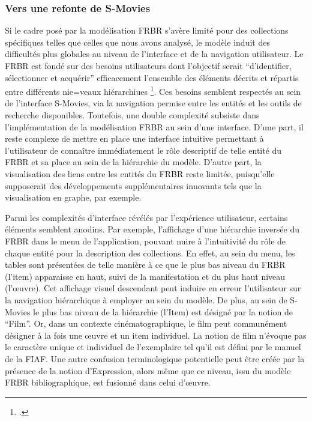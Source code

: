 \subsubsection{Vers une refonte de S-Movies} 

Si le cadre posé par la modélisation FRBR s’avère limité pour des collections spécifiques telles que celles que nous avons analysé, le modèle induit des difficultés plus globales au niveau de l’interface et de la navigation utilisateur. Le FRBR est fondé sur des besoins utilisateurs dont l’objectif serait “d’identifier, sélectionner et acquérir” efficacement l’ensemble des éléments décrits et répartis entre différents nie=veaux hiérarchiues \footcite{zotero-item-646}. Ces besoins semblent respectés au sein de l’interface S-Movies, via la navigation permise entre les entités et les outils de recherche disponibles. Toutefois, une double complexité subsiste dans l’implémentation de la modélisation FRBR au sein d’une interface. D’une part, il reste complexe de mettre en place une interface intuitive permettant à l’utilisateur de connaître immédiatement le rôle descriptif de telle entité du FRBR et sa place au sein de la hiérarchie du modèle. D’autre part, la visualisation des liens entre les entités du FRBR reste limitée, puisqu’elle supposerait des développements supplémentaires innovants tels que la visualisation en graphe, par exemple.  

Parmi les complexités d’interface révélés par l'expérience utilisateur, certains éléments semblent anodins. Par exemple, l’affichage d’une hiérarchie inversée du FRBR dans le menu de l’application, pouvant nuire à l’intuitivité du rôle de chaque entité pour la description des collections. En effet, au sein du menu, les tables sont présentées de telle manière à ce que le plus bas niveau du FRBR (l'item) apparaisse en haut, suivi de la manifestation et du plus haut niveau (l'œuvre). Cet affichage visuel descendant peut induire en erreur l'utilisateur sur la navigation hiérarchique à employer au sein du modèle. De plus, au sein de S-Movies le plus bas niveau de la hiérarchie (l’Item) est désigné par la notion de “Film”. Or, dans un contexte cinématographique, le film peut communément désigner à la fois une œuvre et un item individuel. La notion de film n'évoque pas le caractère unique et individuel de l'exemplaire tel qu'il est défini par le manuel de la FIAF. Une autre confusion terminologique potentielle peut être créée par la présence de la notion d'Expression, alors même que ce niveau, issu du modèle FRBR bibliographique, est fusionné dans celui d'œuvre.  


